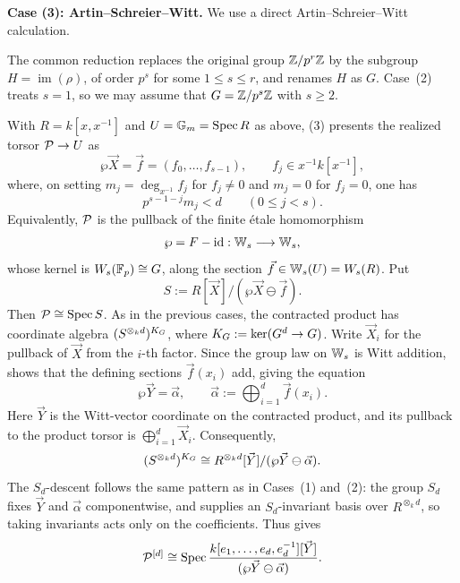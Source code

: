 \medskip
\noindent\textbf{Case (3): Artin--Schreier--Witt.}
We use a direct Artin--Schreier--Witt calculation.

The common reduction replaces the original group $\mathbb{Z}/p^r\mathbb{Z}$ by the subgroup
$H=\operatorname{im}(\rho)$, of order $p^s$ for some $1\leq s\leq r$, and
renames $H$ as $G$. Case~(2) treats $s=1$, so we may assume that
$G=\mathbb{Z}/p^s\mathbb{Z}$ with $s\geq2$.

With $R=k[x,x^{-1}]$ and $U=\mathbb{G}_m=\operatorname{Spec} R$ as above,
(3) presents the realized torsor
$\mathcal{P}\to U$ as
\[
    \wp\vec X=\vec f=(f_0,\dots,f_{s-1}),
    \qquad f_j\in x^{-1}k[x^{-1}],
\]
where, on setting $m_j=\deg_{x^{-1}}f_j$ for $f_j\ne0$ and $m_j=0$ for
$f_j=0$, one has
\[
    p^{s-1-j}m_j<d\qquad(0\leq j<s).
\]
Equivalently, $\mathcal{P}$ is the pullback of the finite \'etale homomorphism
\[
    \wp=F-\mathrm{id}:\mathbb{W}_s\longrightarrow\mathbb{W}_s,
\]
whose kernel is $W_s(\mathbb{F}_p)\cong G$, along the section
$\vec f\in\mathbb{W}_s(U)=W_s(R)$. Put
\[
    S:=R[\vec X]/(\wp\vec X\ominus\vec f).
\]
Then $\mathcal{P}\cong\operatorname{Spec} S$. As in the previous cases, the contracted product has
coordinate algebra $(S^{\otimes_k d})^{K_{G}}$, where
$K_{G}:=\ker(G^d\to G)$. Write
$\vec X_i$ for the pullback of $\vec X$ from the $i$-th factor. Since the
group law on $\mathbb{W}_s$ is Witt addition,
 shows that the defining sections
$\vec f(x_i)$ add, giving the equation
\[
    \wp\vec Y=\vec\alpha,
    \qquad
    \vec\alpha:=\bigoplus_{i=1}^d\vec f(x_i).
\]
Here $\vec Y$ is the Witt-vector coordinate on the contracted product, and
its pullback to the product torsor is
$\bigoplus_{i=1}^d\vec X_i$. Consequently,
\[
    (S^{\otimes_k d})^{K_{G}}
       \cong
    R^{\otimes_k d}[\vec Y]/(\wp\vec Y\ominus\vec\alpha).
\]
The $S_d$-descent follows the same pattern as in Cases~(1) and~(2): the group
$S_d$ fixes $\vec Y$ and $\vec\alpha$ componentwise, and
 supplies an $S_d$-invariant basis over
$R^{\otimes_k d}$, so taking invariants acts only on the coefficients. Thus
 gives
\[
    \mathcal{P}^{[d]}\cong
    \operatorname{Spec}\frac{k[e_1,\dots,e_d,e_d^{-1}][\vec Y]}
                   {(\wp\vec Y\ominus\vec\alpha)}.
\]


